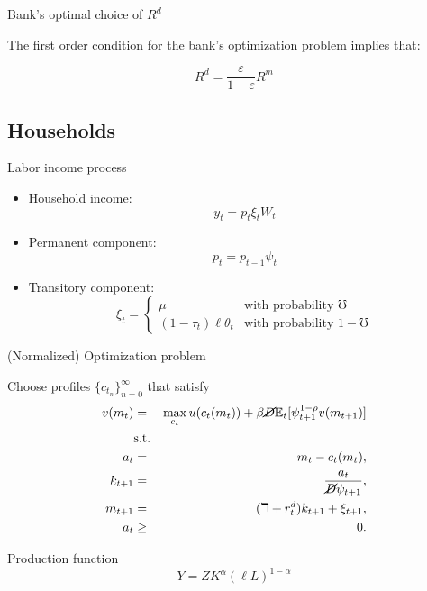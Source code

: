 \documentclass{beamer}
\begin{document}
\begin{frame}[label=focslide]{Bank's optimal choice of  $R^d$}

\small
\par  The first order condition for the bank's optimization problem implies that:

\[
R^d  = \frac{\varepsilon}{1+ \varepsilon} R^m 
\]

\vspace{1em}
\hyperlink{bankmodel}{}

\end{frame}

  
\subsection{Households}

\small
\begin{frame}{Labor income process}

\begin{itemize}
\item Household income: $$y_t = p_t \xi_t W_t$$
\item Permanent component: $$p_t = p_{t-1} \psi_t$$
\item Transitory component: $$\xi_t =
    \begin{cases}
       \mu & \text{with probability $\mho$} \\
      (1-\tau_t) \ell \theta_t & \text{with probability $1-\mho$}
   \end{cases}$$
\end{itemize}

\end{frame}

\footnotesize
\begin{frame}{(Normalized) Optimization problem}

Choose profiles $\{c_{t_n}\}_{n=0}^{\infty}$ that satisfy
 \begin{eqnarray*}
  v(m_t) &=& \max_{c_t} u(c_t(m_t)) + \beta \cancel{D} \mathbb{E}_{t}[\psi_{t+1}^{1-\rho}v(m_{t+1})] \\
  &\text{s.t.}& \\
  a_t &=& m_t - c_t(m_t), \\
  k_{t+1} &=& \frac{a_t}{\cancel{D}\psi_{t+1}}, \\
  m_{t+1} &=& (\daleth + r^d_t)k_{t+1} + \xi_{t+1}, \\
  a_t &\geq& 0.
\end{eqnarray*}

Production function $$Y = Z K^{\alpha} (\ell L)^{1-\alpha}$$

\end{frame}
\end{document}
